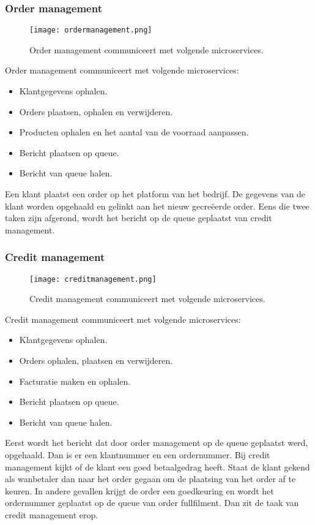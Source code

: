 \subsubsection{Order management}
\begin{figure}[h]
	\texttt{[image: ordermanagement.png]}
	\caption{Order management communiceert met volgende microservices.}
	\centering
\end{figure}
Order management communiceert met volgende microservices:
\begin{itemize}
	\item Klantgegevens ophalen.
	\item Orders plaatsen, ophalen en verwijderen.
	\item Producten ophalen en het aantal van de voorraad aanpassen.
	\item Bericht plaatsen op queue.
	\item Bericht van queue halen.
\end{itemize}
Een klant plaatst een order op het platform van het bedrijf. De gegevens van de klant worden opgehaald en gelinkt aan het nieuw gecreëerde order. Eens die twee taken zijn afgerond, wordt het bericht op de queue geplaatst van credit management.

\subsubsection{Credit management}
\begin{figure}[h]
	\texttt{[image: creditmanagement.png]}
	\caption{Credit management communiceert met volgende microservices.}
	\centering
\end{figure}
Credit management communiceert met volgende microservices:
\begin{itemize}
	\item Klantgegevens ophalen.
	\item Orders ophalen, plaatsen en verwijderen.
	\item Facturatie maken en ophalen.
	\item Bericht plaatsen op queue.
	\item Bericht van queue halen.
\end{itemize}
Eerst wordt het bericht dat door order management op de queue geplaatst werd, opgehaald. Dan is er een klantnummer en een ordernummer. Bij credit management kijkt of de klant een goed betaalgedrag heeft. Staat de klant gekend als wanbetaler dan naar het order gegaan om de plaatsing van het order af te keuren. In andere gevallen krijgt de order een goedkeuring en wordt het ordernummer geplaatst op de queue van order fullfilment. Dan zit de taak van credit management erop.

